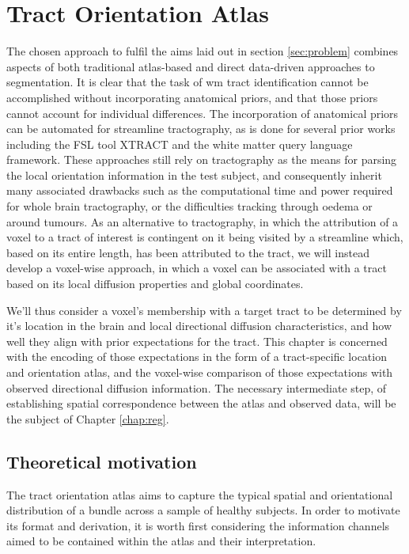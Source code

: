 \chapter{Tract Orientation Atlas}
\label{chap:atlas}


The chosen approach to fulfil the aims laid out in section \ref{sec:problem} combines aspects of both traditional atlas-based and direct data-driven approaches to segmentation.
It is clear that the task of \gls{wm} tract identification cannot be accomplished without incorporating anatomical priors, and that those priors cannot account for individual differences.
The incorporation of anatomical priors can be automated for streamline tractography, as is done for several prior works including the FSL tool XTRACT\autocite{Warrington2020} and the white matter query language framework.\autocite{Wassermann2016}
These approaches still rely on tractography as the means for parsing the local orientation information in the test subject, and consequently inherit many associated drawbacks such as the computational time and power required for whole brain tractography, or the difficulties tracking through oedema or around tumours.
As an alternative to tractography, in which the attribution of a voxel to a tract of interest is contingent on it being visited by a streamline which, based on its entire length, has been attributed to the tract, we will instead develop a voxel-wise approach, in which a voxel can be associated with a tract based on its local diffusion properties and global coordinates.

We'll thus consider a voxel's membership with a target tract to be determined by it's location in the brain and local directional diffusion characteristics, and how well they align with prior expectations for the tract.
This chapter is concerned with the encoding of those expectations in the form of a tract-specific location and orientation atlas, and the voxel-wise comparison of those expectations with observed directional diffusion information.
The necessary intermediate step, of establishing spatial correspondence between the atlas and observed data, will be the subject of Chapter \ref{chap:reg}.

\section{Theoretical motivation}

The tract orientation atlas aims to capture the typical spatial and orientational distribution of a bundle across a sample of healthy subjects.
In order to motivate its format and derivation, it is worth first considering the information channels aimed to be contained within the atlas and their interpretation.

